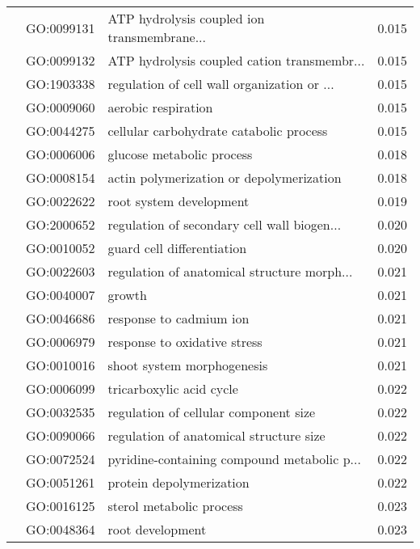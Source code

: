 \begin{longtable}{lllr}
   & GO:0099131 &  ATP hydrolysis coupled ion transmembrane... &         0.015 \\
   & GO:0099132 &  ATP hydrolysis coupled cation transmembr... &         0.015 \\
   & GO:1903338 &  regulation of cell wall organization or ... &         0.015 \\
   & GO:0009060 &                          aerobic respiration &         0.015 \\
   & GO:0044275 &      cellular carbohydrate catabolic process &         0.015 \\
   & GO:0006006 &                    glucose metabolic process &         0.018 \\
   & GO:0008154 &     actin polymerization or depolymerization &         0.018 \\
   & GO:0022622 &                      root system development &         0.019 \\
   & GO:2000652 &  regulation of secondary cell wall biogen... &         0.020 \\
   & GO:0010052 &                   guard cell differentiation &         0.020 \\
   & GO:0022603 &  regulation of anatomical structure morph... &         0.021 \\
   & GO:0040007 &                                       growth &         0.021 \\
   & GO:0046686 &                      response to cadmium ion &         0.021 \\
   & GO:0006979 &                 response to oxidative stress &         0.021 \\
   & GO:0010016 &                   shoot system morphogenesis &         0.021 \\
   & GO:0006099 &                     tricarboxylic acid cycle &         0.022 \\
   & GO:0032535 &        regulation of cellular component size &         0.022 \\
   & GO:0090066 &      regulation of anatomical structure size &         0.022 \\
   & GO:0072524 &  pyridine-containing compound metabolic p... &         0.022 \\
   & GO:0051261 &                     protein depolymerization &         0.022 \\
   & GO:0016125 &                     sterol metabolic process &         0.023 \\
   & GO:0048364 &                             root development &         0.023 \\

\end{longtable}
